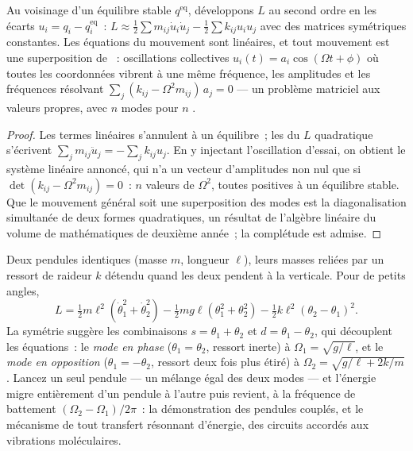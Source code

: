 \begin{proposition}\label{prop:b3:lagrangian-mechanics:modes}
Au voisinage d'un équilibre stable $q^{\text{eq}}$, développons $L$ au
second ordre en les écarts $u_i = q_i - q_i^{\text{eq}}$~:
$L \approx \tfrac12\sum m_{ij}\dot u_i\dot u_j -
\tfrac12\sum k_{ij}u_iu_j$ avec des matrices symétriques constantes. Les
équations du mouvement sont linéaires, et tout mouvement est une
superposition de \emph{}~: oscillations collectives $u_i(t) = a_i\cos(\Omega t
+ \phi)$ où toutes les coordonnées vibrent à une même fréquence, les
amplitudes et les fréquences résolvant $\sum_j(k_{ij} -
\Omega^2m_{ij})\,a_j = 0$ --- un problème matriciel aux valeurs
propres, avec $n$ modes pour $n$ .
\end{proposition}

\begin{proof}
Les termes linéaires s'annulent à un équilibre~; les  du $L$ quadratique s'écrivent
$\sum_jm_{ij}\ddot u_j = -\sum_jk_{ij}u_j$. En y injectant
l'oscillation d'essai, on obtient le système linéaire annoncé, qui n'a
un vecteur d'amplitudes non nul que si $\det(k_{ij} -
\Omega^2m_{ij}) = 0$~: $n$ valeurs de $\Omega^2$, toutes positives à un
équilibre stable. Que le mouvement général soit une superposition des
modes est la diagonalisation simultanée de deux formes quadratiques, un
résultat de l'algèbre linéaire du volume de mathématiques de deuxième
année~; la complétude est admise.
\end{proof}

\begin{example}\label{ex:b3:lagrangian-mechanics:coupled}
Deux pendules identiques (masse $m$, longueur $\ell$), leurs masses
reliées par un ressort de raideur $k$ détendu quand les deux pendent à
la verticale. Pour de petits angles,
\[
L = \tfrac12 m\ell^2(\dot\theta_1^2 + \dot\theta_2^2)
 - \tfrac12 mg\ell(\theta_1^2 + \theta_2^2)
 - \tfrac12 k\ell^2(\theta_2 - \theta_1)^2 .
\]
La symétrie suggère les combinaisons $s = \theta_1 + \theta_2$ et $d =
\theta_1 - \theta_2$, qui découplent les équations~: le \emph{mode en
phase} ($\theta_1 = \theta_2$, ressort inerte) à $\Omega_1 =
\sqrt{g/\ell}$, et le \emph{mode en opposition} ($\theta_1 = -\theta_2$,
ressort deux fois plus étiré) à $\Omega_2 = \sqrt{g/\ell + 2k/m}$.
Lancez un seul pendule --- un mélange égal des deux modes --- et
l'énergie migre entièrement d'un pendule à l'autre puis revient, à la
fréquence de battement $(\Omega_2 - \Omega_1)/2\pi$~: la démonstration
des pendules couplés, et le mécanisme de tout transfert résonnant
d'énergie, des circuits accordés aux vibrations moléculaires.
\end{example}

